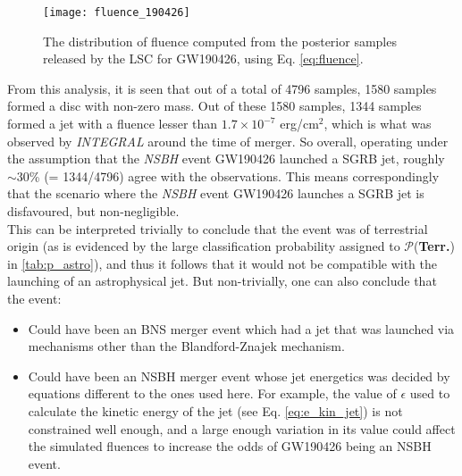         \begin{figure}[ht]
            \centering
            \texttt{[image: fluence\_190426]}
            \caption[Fluence distribution for GW190426, from LSC Posteriors]
            {
                The distribution of fluence computed from the posterior samples released
                by the LSC for GW190426, using Eq. \ref{eq:fluence}.
            }
            \label{fig:fluence_190426}
        \end{figure}

        From this analysis, it is seen that out of a total of 4796 samples, 1580 samples
        formed a disc with non-zero mass. Out of these 1580 samples, 1344 samples formed
        a jet with a fluence lesser than $1.7 \times 10^{-7}$ erg/cm$^2$, which is what
        was observed by \textit{INTEGRAL} around the time of merger. So overall, operating under
        the assumption that the \emph{NSBH} event GW190426 launched a SGRB jet, roughly
        $\sim 30$\% (= 1344/4796) agree with the observations.  This means correspondingly
        that the scenario where the \emph{NSBH} event GW190426 launches a SGRB jet is
        disfavoured, but non-negligible.\\
        This can be interpreted trivially to conclude that the event was of terrestrial
        origin (as is evidenced by the large classification probability assigned to
        $\mathcal{P}$(\textbf{Terr.}) in \ref{tab:p_astro}), and thus it follows that it
        would not be compatible with the launching of an astrophysical jet. But
        non-trivially, one can also conclude that the event:
        \begin{itemize}
            \item  Could have been an BNS merger event which had a jet that was launched
                via mechanisms other than the Blandford-Znajek mechanism.

            \item Could have been an NSBH merger event whose jet energetics was
                decided by equations different to the ones used here. For example, the
                value of $\epsilon$ used to calculate the kinetic energy of the jet (see
                Eq. \ref{eq:e_kin_jet}) is not constrained well enough, and a large enough
                variation in its value could affect the simulated fluences to increase
                the odds of GW190426 being an NSBH event.

        \end{itemize}

